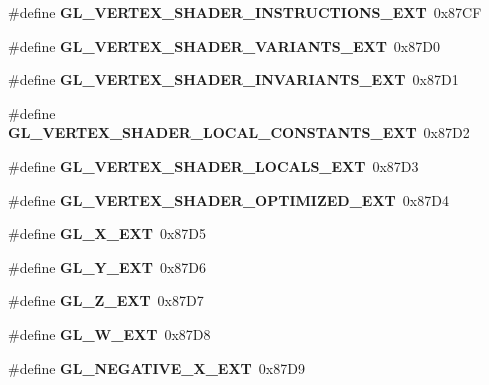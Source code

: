 \begin{DoxyCompactItemize}
\item 
\#define {\bfseries G\+L\+\_\+\+V\+E\+R\+T\+E\+X\+\_\+\+S\+H\+A\+D\+E\+R\+\_\+\+I\+N\+S\+T\+R\+U\+C\+T\+I\+O\+N\+S\+\_\+\+E\+X\+T}~0x87\+C\+F\label{_s_d_l__opengl_8h_a0ea64049abd884e9cebaaa8b95e1041d}

\item 
\#define {\bfseries G\+L\+\_\+\+V\+E\+R\+T\+E\+X\+\_\+\+S\+H\+A\+D\+E\+R\+\_\+\+V\+A\+R\+I\+A\+N\+T\+S\+\_\+\+E\+X\+T}~0x87\+D0\label{_s_d_l__opengl_8h_ad6eb89b849a8e30bed30c3da862fcea9}

\item 
\#define {\bfseries G\+L\+\_\+\+V\+E\+R\+T\+E\+X\+\_\+\+S\+H\+A\+D\+E\+R\+\_\+\+I\+N\+V\+A\+R\+I\+A\+N\+T\+S\+\_\+\+E\+X\+T}~0x87\+D1\label{_s_d_l__opengl_8h_a04d8ac005fc6e8c6bfbf4e95689ebbd5}

\item 
\#define {\bfseries G\+L\+\_\+\+V\+E\+R\+T\+E\+X\+\_\+\+S\+H\+A\+D\+E\+R\+\_\+\+L\+O\+C\+A\+L\+\_\+\+C\+O\+N\+S\+T\+A\+N\+T\+S\+\_\+\+E\+X\+T}~0x87\+D2\label{_s_d_l__opengl_8h_a09186e17c212551bf18ee0f8e1501425}

\item 
\#define {\bfseries G\+L\+\_\+\+V\+E\+R\+T\+E\+X\+\_\+\+S\+H\+A\+D\+E\+R\+\_\+\+L\+O\+C\+A\+L\+S\+\_\+\+E\+X\+T}~0x87\+D3\label{_s_d_l__opengl_8h_a73a235b24cfd1a73aa70ebc32564c116}

\item 
\#define {\bfseries G\+L\+\_\+\+V\+E\+R\+T\+E\+X\+\_\+\+S\+H\+A\+D\+E\+R\+\_\+\+O\+P\+T\+I\+M\+I\+Z\+E\+D\+\_\+\+E\+X\+T}~0x87\+D4\label{_s_d_l__opengl_8h_a05a2fc9a7bbd0c719c484b9c626f339d}

\item 
\#define {\bfseries G\+L\+\_\+\+X\+\_\+\+E\+X\+T}~0x87\+D5\label{_s_d_l__opengl_8h_a1232c40bf70affc84247b16674e4d614}

\item 
\#define {\bfseries G\+L\+\_\+\+Y\+\_\+\+E\+X\+T}~0x87\+D6\label{_s_d_l__opengl_8h_a7ac1af55b77c0b6a58dcac585dabcf9e}

\item 
\#define {\bfseries G\+L\+\_\+\+Z\+\_\+\+E\+X\+T}~0x87\+D7\label{_s_d_l__opengl_8h_a711f6d3cab8ca90215d2b047f70f11f2}

\item 
\#define {\bfseries G\+L\+\_\+\+W\+\_\+\+E\+X\+T}~0x87\+D8\label{_s_d_l__opengl_8h_afcc172282476a03c027d70f559bbad13}

\item 
\#define {\bfseries G\+L\+\_\+\+N\+E\+G\+A\+T\+I\+V\+E\+\_\+\+X\+\_\+\+E\+X\+T}~0x87\+D9\label{_s_d_l__opengl_8h_a0680318a5ad06e98e6631ec0fef01144}


\end{DoxyCompactItemize}

